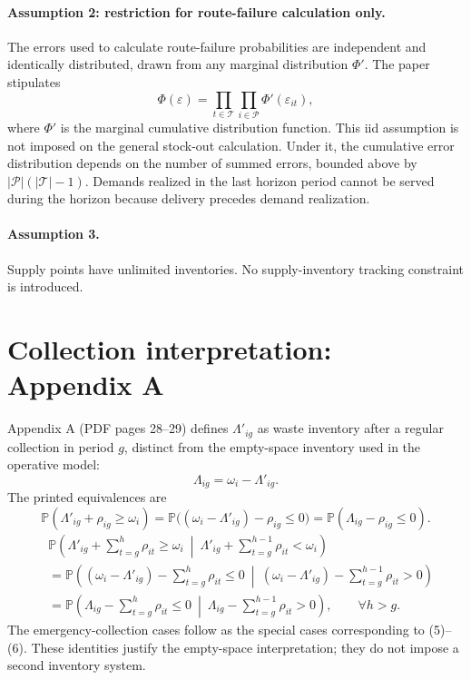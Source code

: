 \documentclass[10pt]{article}
\begin{document}
\paragraph{Assumption 2: restriction for route-failure calculation only.}
The errors used to calculate route-failure probabilities are independent and identically distributed, drawn from any marginal distribution $\Phi'$. The paper stipulates
\begin{equation}
\Phi(\varepsilon)=\prod_{t\in\mathcal T}\prod_{i\in\mathcal P}\Phi'(\varepsilon_{it}),
\tag{10}
\end{equation}
where $\Phi'$ is the marginal cumulative distribution function. This iid assumption is not imposed on the general stock-out calculation. Under it, the cumulative error distribution depends on the number of summed errors, bounded above by $|\mathcal P|(|\mathcal T|-1)$. Demands realized in the last horizon period cannot be served during the horizon because delivery precedes demand realization.

\paragraph{Assumption 3.}
Supply points have unlimited inventories. No supply-inventory tracking constraint is introduced.

\section*{Collection interpretation: Appendix A}
Appendix A (PDF pages 28--29) defines $\Lambda'_{ig}$ as waste inventory after a regular collection in period $g$, distinct from the empty-space inventory used in the operative model:
\[
\Lambda_{ig}=\omega_i-\Lambda'_{ig}.
\]
The printed equivalences are
\begin{equation}
\mathbb P(\Lambda'_{ig}+\rho_{ig}\geqslant\omega_i)
=\mathbb P\bigl((\omega_i-\Lambda'_{ig})-\rho_{ig}\leqslant0\bigr)
=\mathbb P(\Lambda_{ig}-\rho_{ig}\leqslant0).
\tag{A.1}
\end{equation}
\begin{equation}
\begin{aligned}
&\mathbb P\left(\Lambda'_{ig}+\sum_{t=g}^{h}\rho_{it}\geqslant\omega_i\ \middle|\ \Lambda'_{ig}+\sum_{t=g}^{h-1}\rho_{it}<\omega_i\right)\\
&=\mathbb P\left((\omega_i-\Lambda'_{ig})-\sum_{t=g}^{h}\rho_{it}\leqslant0\ \middle|\ (\omega_i-\Lambda'_{ig})-\sum_{t=g}^{h-1}\rho_{it}>0\right)\\
&=\mathbb P\left(\Lambda_{ig}-\sum_{t=g}^{h}\rho_{it}\leqslant0\ \middle|\ \Lambda_{ig}-\sum_{t=g}^{h-1}\rho_{it}>0\right),\qquad\forall h>g.
\end{aligned}\tag{A.2}
\end{equation}
The emergency-collection cases follow as the special cases corresponding to (5)--(6). These identities justify the empty-space interpretation; they do not impose a second inventory system.
\end{document}
